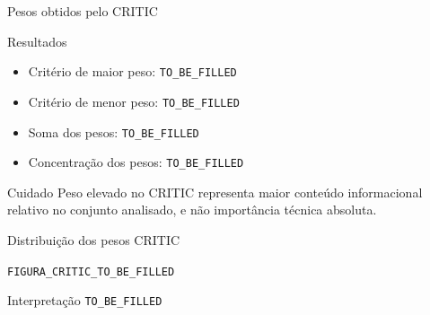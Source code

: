 
\begin{frame}{Pesos obtidos pelo CRITIC}

    \begin{block}{Resultados}
        \begin{itemize}
            \item Critério de maior peso:
                  \texttt{TO\_BE\_FILLED}

            \item Critério de menor peso:
                  \texttt{TO\_BE\_FILLED}

            \item Soma dos pesos:
                  \texttt{TO\_BE\_FILLED}

            \item Concentração dos pesos:
                  \texttt{TO\_BE\_FILLED}
        \end{itemize}
    \end{block}

    \vspace{0.3cm}

    \begin{alertblock}{Cuidado}
        Peso elevado no CRITIC representa maior conteúdo informacional
        relativo no conjunto analisado, e não importância técnica
        absoluta.
    \end{alertblock}

\end{frame}



\begin{frame}{Distribuição dos pesos CRITIC}

    \begin{center}

        \texttt{FIGURA\_CRITIC\_TO\_BE\_FILLED}

    \end{center}

    \vspace{0.3cm}

    \begin{block}{Interpretação}
        \texttt{TO\_BE\_FILLED}
    \end{block}

\end{frame}

